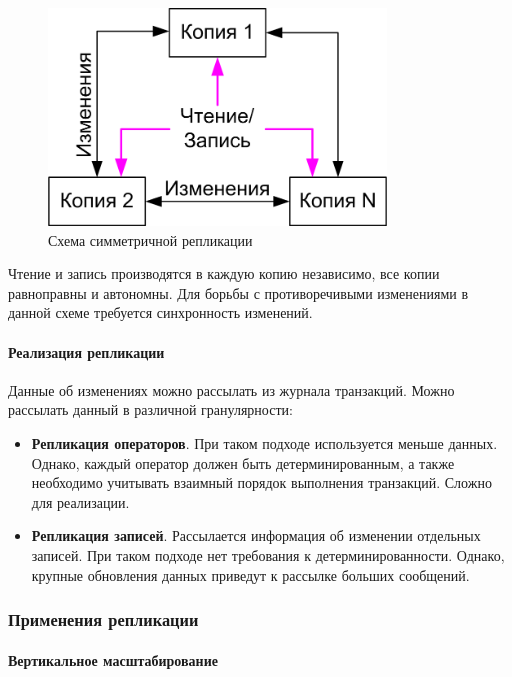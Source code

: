 \begin{figure}[h]
	\centering
	\includegraphics[width=0.8\textwidth]{../assets/kgeorgiy/distributed/Replication_Symmetric.png}
	\caption{Схема симметричной репликации}
	\label{repl-symm}
\end{figure}

Чтение и запись производятся в каждую копию независимо, все копии равноправны и автономны. Для
борьбы с противоречивыми изменениями в данной схеме требуется синхронность изменений.

\paragraph{Реализация репликации}

Данные об изменениях можно рассылать из журнала транзакций. Можно рассылать данный в различной
гранулярности:

\begin{itemize}
	\item \textbf{Репликация операторов}. При таком подходе используется меньше данных. Однако,
	      каждый оператор должен быть детерминированным, а также необходимо учитывать взаимный порядок
	      выполнения транзакций. Сложно для реализации.
	\item \textbf{Репликация записей}. Рассылается информация об изменении отдельных записей. При
	      таком подходе нет требования к детерминированности. Однако, крупные обновления данных приведут к
	      рассылке больших сообщений.
\end{itemize}

\subsubsection{Применения репликации}

\paragraph{Вертикальное масштабирование}

